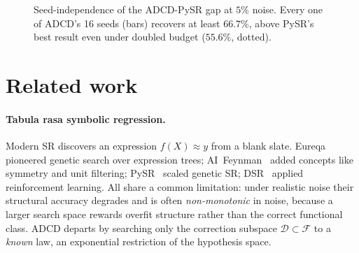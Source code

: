 \documentclass{article}
\begin{document}
\begin{figure}[t]
\centering
{}
\caption{Seed-independence of the ADCD-PySR gap at $5\%$ noise. Every one of ADCD's 16 seeds (bars) recovers at least $66.7\%$, above PySR's best result even under doubled budget ($55.6\%$, dotted).}
\label{fig:seeds}
\end{figure}

\section{Related work}
\label{sec:related}

\paragraph{Tabula rasa symbolic regression.}
Modern SR discovers an expression $f(X)\!\approx\!y$ from a blank slate. Eureqa~\cite{schmidt2009distilling} pioneered genetic search over expression trees; AI~Feynman~\cite{udrescu2020ai} added concepts like symmetry and unit filtering; PySR~\cite{cranmer2020pysr} scaled genetic SR; DSR~\cite{petersen2021deep} applied reinforcement learning. All share a common limitation: under realistic noise their structural accuracy degrades and is often \emph{non-monotonic} in noise, because a larger search space rewards overfit structure rather than the correct functional class. ADCD departs by searching only the correction subspace $\mathcal{D}\!\subset\!\mathcal{F}$ to a \emph{known} law, an exponential restriction of the hypothesis space.
\end{document}
